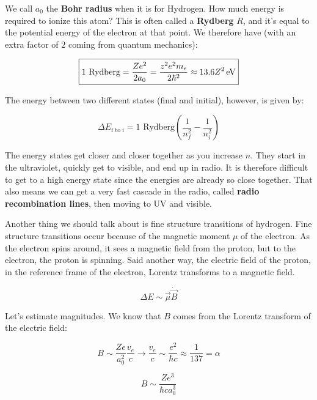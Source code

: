 \documentclass{article}
\newcommand{\unit}[1]{{\,\rm #1}}
\newcommand{\ev}{\unit{eV}}
\begin{document}
We call $a_0$ the \textbf{Bohr radius} when it is for Hydrogen. How much energy is required to ionize this atom? This is often called a \textbf{Rydberg} $R$, and it's equal to the potential energy of the electron at that point. We therefore have (with an extra factor of $2$ coming from quantum mechanics):

\begin{equation}
    \boxed{1 \text{ Rydberg} = \frac{Z e^2}{2 a_0} = \frac{z^2 e^2 m_e}{2\hbar^2} \approx 13.6 Z^2 \ev}
\end{equation}

The energy between two different states (final and initial), however, is given by:

\begin{equation}
    \boxed{\Delta E_{\text{f to i}} = 1 \text{ Rydberg} \left(\frac{1}{n_f^2} - \frac{1}{n_i^2}\right)}
\end{equation}

The energy states get closer and closer together as you increase $n$. They start in the ultraviolet, quickly get to visible, and end up in radio. It is therefore difficult to get to a high energy state since the energies are already so close together. That also means we can get a very fast cascade in the radio, called \textbf{radio recombination lines}, then moving to UV and visible.

Another thing we should talk about is fine structure transitions of hydrogen. Fine structure transitions occur because of the magnetic moment $\mu$ of the electron. As the electron spins around, it sees a magnetic field from the proton,  but to the electron, the proton is spinning. Said another way, the electric field of the proton, in the reference frame of the electron, Lorentz transforms to a magnetic field.

\begin{equation}
    \Delta E \sim \vec{\mu} \dot \vec{B}
\end{equation}

Let's estimate magnitudes. We know that $B$ comes from the Lorentz transform of the electric field:

\begin{equation}
    B \sim \frac{Ze}{a_0^2}\frac{v_e}{c} \rightarrow \frac{v_e}{c} \sim \frac{e^2}{\hbar c } \approx \frac{1}{137} = \alpha
\end{equation}

\begin{equation}
    B \sim \frac{Z e^3}{\hbar c a_0^3}
\end{equation}
\end{document}
